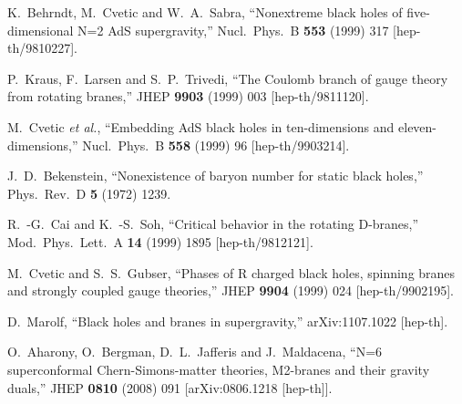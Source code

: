\begin{thebibliography}{99}

%
%

  
  K.~Behrndt, M.~Cvetic and W.~A.~Sabra,
  ``Nonextreme black holes of five-dimensional N=2 AdS supergravity,''
  Nucl.\ Phys.\ B {\bf 553} (1999) 317
  [hep-th/9810227].

  P.~Kraus, F.~Larsen and S.~P.~Trivedi,
  ``The Coulomb branch of gauge theory from rotating branes,''
  JHEP {\bf 9903} (1999) 003
  [hep-th/9811120].

  M.~Cvetic {\it et al.},
  ``Embedding AdS black holes in ten-dimensions and eleven-dimensions,''
  Nucl.\ Phys.\ B {\bf 558} (1999) 96
  [hep-th/9903214].

  J.~D.~Bekenstein,
  ``Nonexistence of baryon number for static black holes,''
  Phys.\ Rev.\ D {\bf 5} (1972) 1239.

  R.~-G.~Cai and K.~-S.~Soh,
  ``Critical behavior in the rotating D-branes,''
  Mod.\ Phys.\ Lett.\ A {\bf 14} (1999) 1895
  [hep-th/9812121].

  M.~Cvetic and S.~S.~Gubser,
  ``Phases of R charged black holes, spinning branes and strongly coupled gauge theories,''
  JHEP {\bf 9904} (1999) 024
  [hep-th/9902195].


  D.~Marolf,
  ``Black holes and branes in supergravity,''
  arXiv:1107.1022 [hep-th].
  
  O.~Aharony, O.~Bergman, D.~L.~Jafferis and J.~Maldacena,
  ``N=6 superconformal Chern-Simons-matter theories, M2-branes and their gravity duals,''
  JHEP {\bf 0810} (2008) 091
  [arXiv:0806.1218 [hep-th]].
  

\end{thebibliography}
